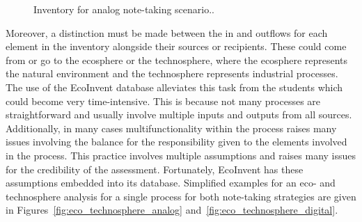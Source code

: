 \begin{figure}[H]
\caption{Inventory for analog note-taking scenario..}\label{fig:inventory_ipad}
\end{figure}

Moreover, a distinction must be made between the in and outflows for each element in the inventory alongside their sources or recipients. These could come from or go to the ecosphere or the technosphere, where the ecosphere represents the natural environment and the technosphere represents industrial processes. The use of the EcoInvent database alleviates this task from the students which could become very time-intensive. This is because not many processes are straightforward and usually involve multiple inputs and outputs from all sources. Additionally, in many cases multifunctionality within the process raises many issues involving the balance for the responsibility given to the elements involved in the process. This practice involves multiple assumptions and raises many issues for the credibility of the assessment. Fortunately, EcoInvent has these assumptions embedded into its database. Simplified examples for an eco- and technosphere analysis for a single process for both note-taking strategies are given in Figures~\ref{fig:eco_technosphere_analog} and~\ref{fig:eco_technosphere_digital}.

